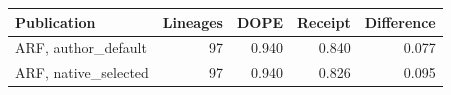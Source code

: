 \begin{tabular}{@{}lrrrr@{}}
\toprule
Publication & Lineages & DOPE & Receipt & Difference \\
\midrule
ARF, author\_default & 97 & 0.940 & 0.840 & 0.077 \\
ARF, native\_selected & 97 & 0.940 & 0.826 & 0.095 \\
\bottomrule
\end{tabular}
